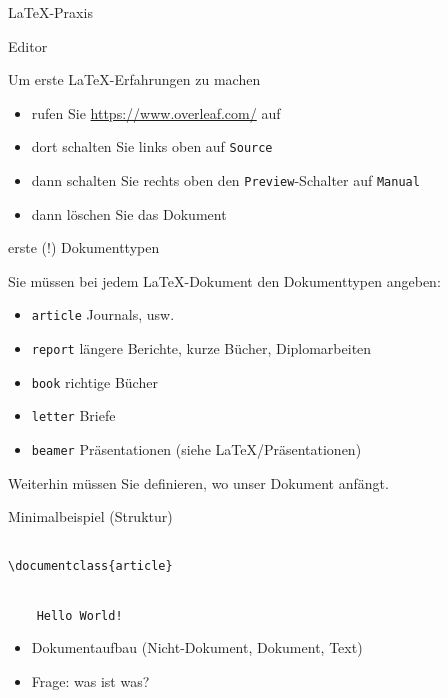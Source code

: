 \begin{frame}{\LaTeX-Praxis}

\end{frame}

\begin{frame}{Editor}

Um erste \LaTeX-Erfahrungen zu machen

\begin{itemize}
\itemsep1pt\parskip0pt
\item
  rufen Sie \url{https://www.overleaf.com/} auf
\item
  dort schalten Sie links oben auf \texttt{Source}
\item
  dann schalten Sie rechts oben den \texttt{Preview}-Schalter auf
  \texttt{Manual}
\item
  dann löschen Sie das Dokument
\end{itemize}

\end{frame}

\begin{frame}{erste (!) Dokumenttypen}

Sie müssen bei jedem \LaTeX-Dokument den Dokumenttypen angeben:
\begin{itemize}
\item \texttt{article} Journals, usw.
\item \texttt{report} längere Berichte, kurze Bücher, Diplomarbeiten
\item \texttt{book} richtige Bücher
\item \texttt{letter} Briefe
\item \texttt{beamer} Präsentationen (siehe \LaTeX/Präsentationen)
\end{itemize}

Weiterhin müssen Sie definieren, wo unser Dokument anfängt.

\end{frame}

\begin{frame}[fragile]{Minimalbeispiel (Struktur)}

\begin{verbatim}

\documentclass{article}


    Hello World!

\end{verbatim}

\begin{itemize}
\item Dokumentaufbau (Nicht-Dokument, Dokument, Text)
\item Frage: was ist was?
\end{itemize}
\end{frame}

